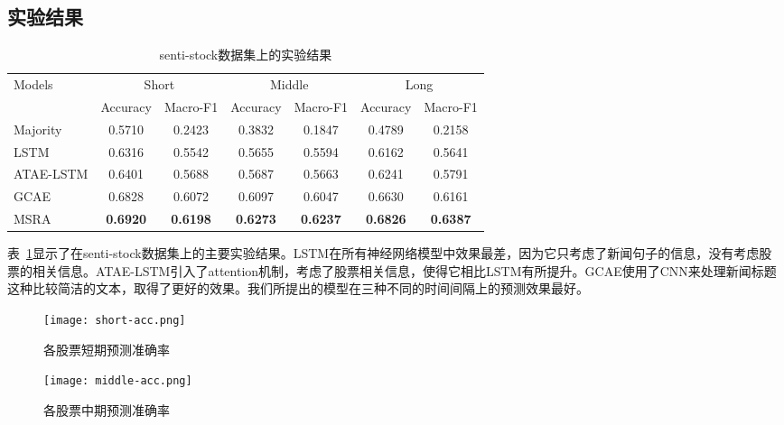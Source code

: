 \subsection{实验结果}
\begin{table}[ht]
    \centering
    \caption{senti-stock数据集上的实验结果}
    \label{tab:mainresult}
    \begin{tabular}{lcccccc}
    \hline
    \multirow{2}{*}{Models} & \multicolumn{2}{c}{Short}         & \multicolumn{2}{c}{Middle}        & \multicolumn{2}{c}{Long}                                \\ \cline{2-7} 
                            & Accuracy        & Macro-F1        & Accuracy        & Macro-F1        & Accuracy                   & Macro-F1                   \\ \hline
    Majority                & 0.5710          & 0.2423          & 0.3832          & 0.1847          & 0.4789                     & 0.2158                     \\
    LSTM                    & 0.6316          & 0.5542          & 0.5655          & 0.5594          & 0.6162                     & 0.5641                     \\
    ATAE-LSTM               & 0.6401          & 0.5688          & 0.5687          & 0.5663          & 0.6241                     & 0.5791                     \\
    GCAE                    & 0.6828          & 0.6072          & 0.6097          & 0.6047          & 0.6630                     & 0.6161                     \\
    MSRA                    & \textbf{0.6920} & \textbf{0.6198} & \textbf{0.6273} & \textbf{0.6237} & \textbf{0.6826}            & \textbf{0.6387}            \\ \hline
    \end{tabular}
\end{table}
表~\ref{tab:mainresult}显示了在senti-stock数据集上的主要实验结果。LSTM在所有神经网络模型中效果最差，因为它只考虑了新闻句子的信息，没有考虑股票的相关信息。ATAE-LSTM引入了attention机制，考虑了股票相关信息，使得它相比LSTM有所提升。GCAE使用了CNN来处理新闻标题这种比较简洁的文本，取得了更好的效果。我们所提出的模型在三种不同的时间间隔上的预测效果最好。
\begin{figure}[H]
    \centering 
    \texttt{[image: short-acc.png]}
    \caption{各股票短期预测准确率}
    \label{fig:short-acc}
\end{figure}
\begin{figure}[H]
    \centering 
    \texttt{[image: middle-acc.png]}
    \caption{各股票中期预测准确率}
    \label{fig:middle-acc}
\end{figure}
